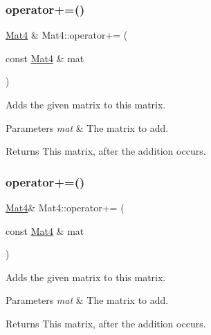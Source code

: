 \subsubsection{\texorpdfstring{operator+=()}{operator+=()}\hspace{0.1cm}{\footnotesize\ttfamily [1/2]}}
{\footnotesize\ttfamily \hyperlink{classMat4}{Mat4} \& Mat4\+::operator+= (\begin{DoxyParamCaption}\item[{const \hyperlink{classMat4}{Mat4} \&}]{mat }\end{DoxyParamCaption})\hspace{0.3cm}{\ttfamily [inline]}}

Adds the given matrix to this matrix.


\begin{DoxyParams}{Parameters}
{\em mat} & The matrix to add. \\
\hline
\end{DoxyParams}
\begin{DoxyReturn}{Returns}
This matrix, after the addition occurs. 
\end{DoxyReturn}
\mbox{\label{classMat4_ae3b797f9d036f0dbe605d73e5bd46cfa}} 
\subsubsection{\texorpdfstring{operator+=()}{operator+=()}\hspace{0.1cm}{\footnotesize\ttfamily [2/2]}}
{\footnotesize\ttfamily \hyperlink{classMat4}{Mat4}\& Mat4\+::operator+= (\begin{DoxyParamCaption}\item[{const \hyperlink{classMat4}{Mat4} \&}]{mat }\end{DoxyParamCaption})\hspace{0.3cm}{\ttfamily [inline]}}

Adds the given matrix to this matrix.


\begin{DoxyParams}{Parameters}
{\em mat} & The matrix to add. \\
\hline
\end{DoxyParams}
\begin{DoxyReturn}{Returns}
This matrix, after the addition occurs. 
\end{DoxyReturn}
\mbox{\label{classMat4_ae56d2c741f3bafc30024da58083bb8f4}} 
